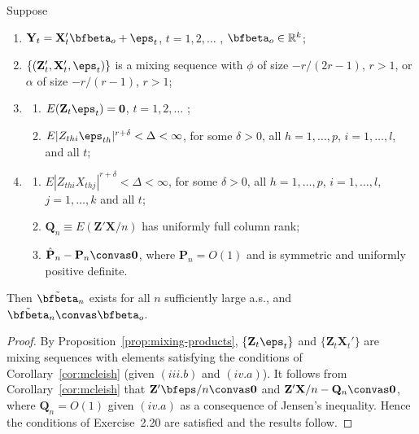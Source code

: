 \begin{theorem}\label{thm:iv-mixing}
Suppose
\begin{enumerate}[label=(\roman*)]
\item $\mathbf{Y}_t = \mathbf{X}_t' \bfbeta_o + \eps_t$, \quad $t = 1, 2, \ldots$ , $\bfbeta_o \in \mathbb{R}^k$;
\item $\{(\mathbf{Z}_t', \mathbf{X}_t', \eps_t)\}$ is a mixing sequence with $\phi$ of size $-r/(2r-1)$, $r > 1$, or $\alpha$ of size $-r/(r-1)$, $r > 1$;
\item \begin{enumerate}[label=(\alph*)]
\item $E(\mathbf{Z}_t \eps_t) = \mathbf{0}$, \quad $t = 1, 2, \ldots$ ;
\item $E|Z_{thi} \eps_{th}|^{r+\delta} < \Delta < \infty$, for some $\delta > 0$, all $h = 1, \ldots, p$, $i = 1, \ldots, l$, and all $t$;
\end{enumerate}
\item \begin{enumerate}[label=(\alph*)]
\item $E|Z_{thi} X_{thj}|^{r+\delta} < \Delta < \infty$, for some $\delta > 0$, all $h = 1, \ldots, p$, $i = 1, \ldots, l$, $j = 1, \ldots, k$ and all $t$;
\item $\mathbf{Q}_n \equiv E(\mathbf{Z}'\mathbf{X}/n)$ has uniformly full column rank;
\item $\hat{\mathbf{P}}_n - \mathbf{P}_n \convas \mathbf{0}$, where $\mathbf{P}_n = O(1)$ and is symmetric and uniformly positive definite.
\end{enumerate}
\end{enumerate}
Then $\tilde{\bfbeta}_n$ exists for all $n$ sufficiently large a.s., and $\tilde{\bfbeta}_n \convas \bfbeta_o$.
\end{theorem}

\begin{proof}
By Proposition~\ref{prop:mixing-products}, $\{\mathbf{Z}_t \eps_t\}$ and $\{\mathbf{Z}_t \mathbf{X}_t'\}$ are mixing sequences with elements satisfying the conditions of Corollary~\ref{cor:mcleish} (given $(iii.b)$ and $(iv.a)$). It follows from Corollary~\ref{cor:mcleish} that $\mathbf{Z}'\bfeps/n \convas \mathbf{0}$ and $\mathbf{Z}'\mathbf{X}/n - \mathbf{Q}_n \convas \mathbf{0}$, where $\mathbf{Q}_n = O(1)$ given $(iv.a)$ as a consequence of Jensen's inequality. Hence the conditions of Exercise~2.20 are satisfied and the results follow. \qedhere
\end{proof}

